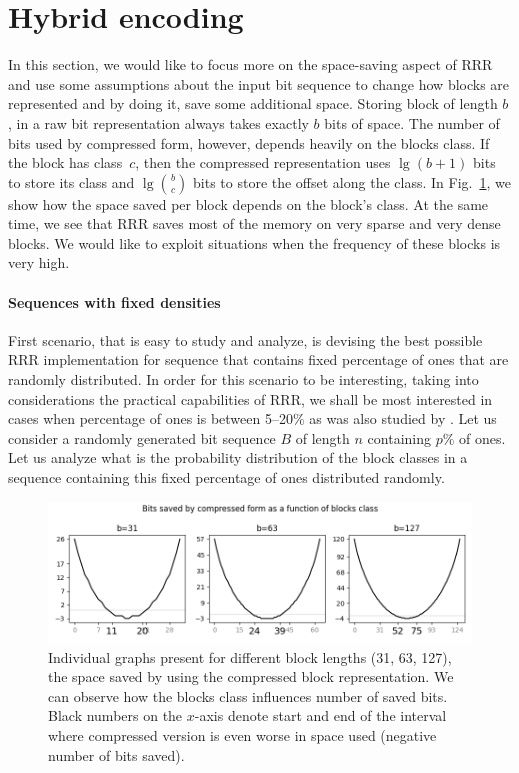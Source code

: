 \section{Hybrid encoding}

In this section, we would like to focus more on the space-saving aspect of RRR and use some
assumptions about the input bit sequence to change how blocks are represented and by doing
it, save some additional space. Storing block of length $b$, in a raw bit representation
always takes exactly $b$ bits of space. The number of bits used by compressed form, however,
depends heavily on the blocks class. If the block has class~$c$, then the compressed
representation uses $\lg (b+1)$ bits to store its class and $\lg {b\choose c}$
bits to store the offset along the class. In Fig.~\ref{obr:rrrSpaceSavings}, we show
how the space saved per block depends on the block’s class. At the same time, we see
that RRR saves most of the memory on very sparse and very dense blocks. We would like
to exploit situations when the frequency of these blocks is very high.

\paragraph{Sequences with fixed densities}

First scenario, that is easy to study and analyze, is devising the best possible RRR
implementation for sequence that contains fixed percentage of ones that are randomly
distributed. In order for this scenario to be interesting, taking into considerations
the practical capabilities of RRR, we shall be most interested in cases when percentage 
of ones is between 5--20\% as was also studied by \cite{navarro2012fast}. Let us consider
a randomly generated bit sequence $B$ of length $n$ containing $p\%$ of ones. Let us
analyze what is the probability distribution of the block classes in a sequence containing
this fixed percentage of ones distributed randomly.
\begin{figure}
	\centerline{
		\includegraphics[width=\textwidth]{images/rrr_space_savings}
	}
	\caption[TODO]{Individual graphs present for different block lengths (31, 63, 127), 
    the space saved by using the compressed block representation. We can observe how
    the blocks class influences number of saved bits. Black numbers on the $x$-axis
    denote start and end of the interval where compressed version is even worse
    in space used (negative number of bits saved).
	}
	\label{obr:rrrSpaceSavings}
\end{figure}

